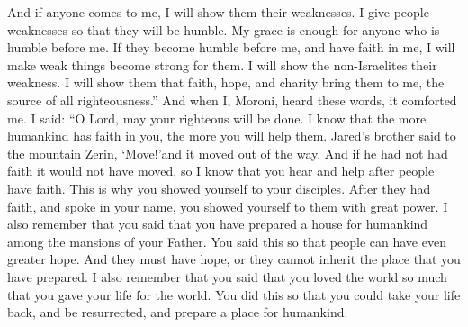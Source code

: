And if anyone comes to me, I will show them their weaknesses. I give people weaknesses so that they will be humble. My grace is enough for anyone who is humble before me. If they become humble before me, and have faith in me, I will make weak things become strong for them.
\bverse \iffalse Behold, I will show unto the Gentiles their weakness and I will show unto them that faith, hope and charity bringeth unto me--the fountain of all righteousness. \fi
I will show the non-Israelites their weakness. I will show them that faith, hope, and charity bring them to me, the source of all righteousness.''
\bverse \iffalse And I, Moroni, having heard these words, was comforted, and said: O Lord, thy righteous will be done, for I know that thou workest unto the children of men according to their faith; \fi
And when I, Moroni, heard these words, it comforted me. I said: ``O Lord, may your righteous will be done. I know that the more humankind has faith in you, the more you will help them.
\bverse \iffalse For the brother of Jared said unto the mountain Zerin, Remove--and it was removed. And if he had not had faith it would not have moved; wherefore thou workest after men have faith. \fi
Jared's brother said to the mountain Zerin, \lq Move!\rq and it moved out of the way. And if he had not had faith it would not have moved, so I know that you hear and help after people have faith.
\bverse \iffalse For thus didst thou manifest thyself unto thy disciples; for after they had faith, and did speak in thy name, thou didst show thyself unto them in great power. \fi
This is why you showed yourself to your disciples. After they had faith, and spoke in your name, you showed yourself to them with great power.
\bverse \iffalse And I also remember that thou hast said that thou hast prepared a house for man, yea, even among the mansions of thy Father, in which man might have a more excellent hope; wherefore man must hope, or he cannot receive an inheritance in the place which thou hast prepared. \fi
I also remember that you said that you have prepared a house for humankind among the mansions of your Father. You said this so that people can have even greater hope. And they must have hope, or they cannot inherit the place that you have prepared.
\bverse \iffalse And again, I remember that thou hast said that thou hast loved the world, even unto the laying down of thy life for the world, that thou mightest take it again to prepare a place for the children of men. \fi
I also remember that you said that you loved the world so much that you gave your life for the world. You did this so that you could take your life back, and be resurrected, and prepare a place for humankind.
